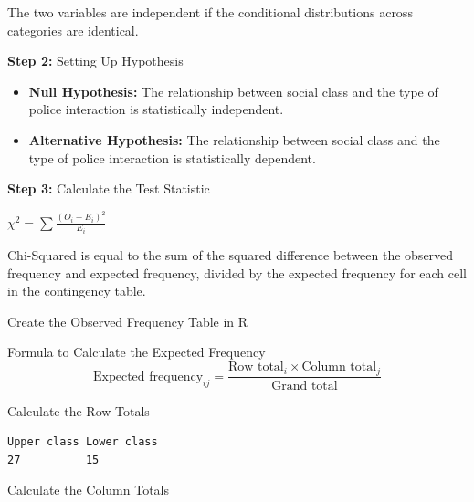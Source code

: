 \documentclass[12pt,letterpaper]{article}
\begin{document}
\noindent The two variables are independent if the conditional distributions across categories are identical.
\vspace{0.5cm}

\noindent\textbf{Step 2:} Setting Up Hypothesis
\begin{itemize}
	\item 
	\textbf{Null Hypothesis:} The relationship between social class and the type of police interaction is statistically independent.
	\item
	\textbf{Alternative Hypothesis:} The relationship between social class and the type of police interaction is statistically dependent.
\end{itemize}

\vspace{0.5cm}
\noindent\textbf{Step 3:} Calculate the Test Statistic

\begin{center}
	 $\chi^2 = \sum \frac{(O_i - E_i)^2}{E_i}$
\end{center}

\noindent Chi-Squared is equal to the sum of the squared difference between the observed frequency and expected frequency, divided by the expected frequency for each cell in the contingency table.

\vspace{.5cm}
\noindent Create the Observed Frequency Table in R 




\vspace{0.5cm}
\noindent Formula to Calculate the Expected Frequency
\[
\text{Expected frequency}_{ij} = \frac{\text{Row total}_i \times \text{Column total}_j}{\text{Grand total}}
\]

\newpage
\vspace{0.5cm}
\noindent Calculate the Row Totals


\begin{verbatim}
Upper class Lower class 
27          15
\end{verbatim}

\vspace{0.5cm}
\noindent Calculate the Column Totals

\end{document}
